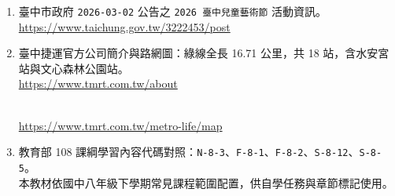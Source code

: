 \documentclass[
  chinese,
  12pt,
  a4paper,
  oneside]{article}
\begin{document}
\begin{enumerate}
\item
  臺中市政府 \texttt{2026-03-02} 公告之 \texttt{2026\ 臺中兒童藝術節}
  活動資訊。\\
  \url{https://www.taichung.gov.tw/3222453/post}
\item
  臺中捷運官方公司簡介與路網圖：綠線全長 16.71 公里，共 18
  站，含水安宮站與文心森林公園站。\\
  \url{https://www.tmrt.com.tw/about}\strut \\
  \url{https://www.tmrt.com.tw/metro-life/map}
\item
  教育部 108
  課綱學習內容代碼對照：\texttt{N-8-3}、\texttt{F-8-1}、\texttt{F-8-2}、\texttt{S-8-12}、\texttt{S-8-5}。\\
  本教材依國中八年級下學期常見課程範圍配置，供自學任務與章節標記使用。
\end{enumerate}
\end{document}
